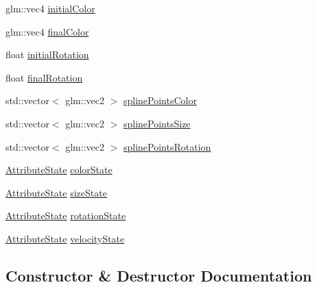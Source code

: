 \begin{DoxyCompactItemize}
\item 
glm\+::vec4 \hyperlink{struct_mason_1_1_particle_emitter_config_a8580419bef5f1d337f75a5224dec0deb}{initial\+Color}
\item 
glm\+::vec4 \hyperlink{struct_mason_1_1_particle_emitter_config_addf94f6df6c784495840b93aa30ce162}{final\+Color}
\item 
float \hyperlink{struct_mason_1_1_particle_emitter_config_a94e5a301870aa19cc1bf14d4613cc879}{initial\+Rotation}
\item 
float \hyperlink{struct_mason_1_1_particle_emitter_config_a37a579321019d25bdb1ecf4f32353d7c}{final\+Rotation}
\item 
std\+::vector$<$ glm\+::vec2 $>$ \hyperlink{struct_mason_1_1_particle_emitter_config_a66a4652dce73b58e27b8a495e2b6e0eb}{spline\+Points\+Color}
\item 
std\+::vector$<$ glm\+::vec2 $>$ \hyperlink{struct_mason_1_1_particle_emitter_config_ae379890e2a2de9c8f4dc1a391393f41a}{spline\+Points\+Size}
\item 
std\+::vector$<$ glm\+::vec2 $>$ \hyperlink{struct_mason_1_1_particle_emitter_config_ae03fbdb37c6738eafedc10564d744e8e}{spline\+Points\+Rotation}
\item 
\hyperlink{namespace_mason_aefc2ce7d9295b57af46ab6c8ebfc32f7}{Attribute\+State} \hyperlink{struct_mason_1_1_particle_emitter_config_a94ad732500966a699dcead307033269a}{color\+State}
\item 
\hyperlink{namespace_mason_aefc2ce7d9295b57af46ab6c8ebfc32f7}{Attribute\+State} \hyperlink{struct_mason_1_1_particle_emitter_config_a3f6f8e64ff56799d85b8512aa97801eb}{size\+State}
\item 
\hyperlink{namespace_mason_aefc2ce7d9295b57af46ab6c8ebfc32f7}{Attribute\+State} \hyperlink{struct_mason_1_1_particle_emitter_config_a35b60fea30c8a07adcfc77a3c30e1546}{rotation\+State}
\item 
\hyperlink{namespace_mason_aefc2ce7d9295b57af46ab6c8ebfc32f7}{Attribute\+State} \hyperlink{struct_mason_1_1_particle_emitter_config_a449a7ec64ad8d9f9be405f1beb5ee507}{velocity\+State}
\end{DoxyCompactItemize}


\subsection{Constructor \& Destructor Documentation}
\hypertarget{struct_mason_1_1_particle_emitter_config_a317aa2e9d325160e20fd1bbefdc244f5}{}\label{struct_mason_1_1_particle_emitter_config_a317aa2e9d325160e20fd1bbefdc244f5} 
